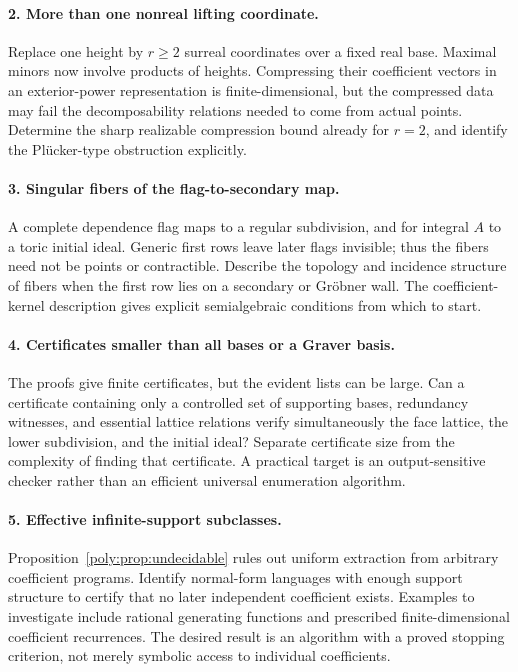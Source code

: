 \documentclass[11pt,a4paper]{article}
\numberwithin{equation}{section}
\theoremstyle{plain}
\begin{document}
\paragraph{2. More than one nonreal lifting coordinate.}
Replace one height by $r\ge2$ surreal coordinates over a fixed real base.
Maximal minors now involve products of heights. Compressing their
coefficient vectors in an exterior-power representation is finite-dimensional,
but the compressed data may fail the decomposability relations needed to
come from actual points. Determine the sharp realizable compression bound
already for $r=2$, and identify the Pl\"ucker-type obstruction explicitly.

\paragraph{3. Singular fibers of the flag-to-secondary map.}
A complete dependence flag maps to a regular subdivision, and for integral
$A$ to a toric initial ideal. Generic first rows leave later flags invisible;
thus the fibers need not be points or contractible. Describe the topology
and incidence structure of fibers when the first row lies on a secondary
or Gr\"obner wall. The coefficient-kernel description gives explicit
semialgebraic conditions from which to start.

\paragraph{4. Certificates smaller than all bases or a Graver basis.}
The proofs give finite certificates, but the evident lists can be large.
Can a certificate containing only a controlled set of supporting bases,
redundancy witnesses, and essential lattice relations verify simultaneously
the face lattice, the lower subdivision, and the initial ideal? Separate
certificate size from the complexity of finding that certificate. A
practical target is an output-sensitive checker rather than an efficient
universal enumeration algorithm.

\paragraph{5. Effective infinite-support subclasses.}
Proposition~\ref{poly:prop:undecidable} rules out uniform extraction from arbitrary
coefficient programs. Identify normal-form languages with enough support
structure to certify that no later independent coefficient exists. Examples
to investigate include rational generating functions and prescribed
finite-dimensional coefficient recurrences. The desired result is an
algorithm with a proved stopping criterion, not merely symbolic access to
individual coefficients.
\end{document}
